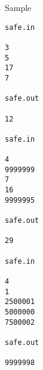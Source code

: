 Sample
\begin{verbatim}
safe.in 
 
3 
5 
17 
7 
 
safe.out 
 
12 

safe.in 
 
4 
9999999 
7 
16 
9999995 
 
safe.out 
 
29

safe.in 
 
4 
1 
2500001 
5000000 
7500002 
 
safe.out 
 
9999998 

\end{verbatim}